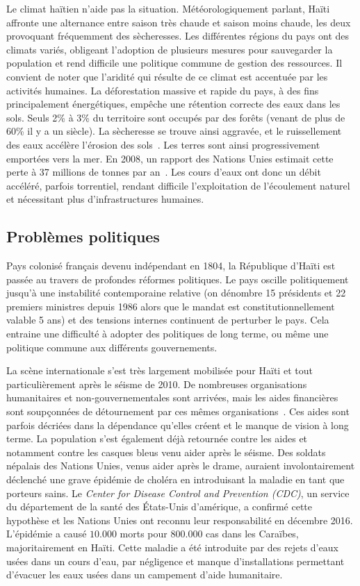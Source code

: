 \documentclass{EPL-master-thesis-covers-FR}
\begin{document}
				Le climat haïtien n'aide pas la situation. Météorologiquement parlant, Haïti affronte une alternance entre saison très chaude et saison moins chaude, les deux provoquant fréquemment des sècheresses. Les différentes régions du pays ont des climats variés, obligeant l'adoption de plusieurs mesures pour sauvegarder la population et rend difficile une politique commune de gestion des ressources. Il convient de noter que l'aridité qui résulte de ce climat est accentuée par les activités humaines. La déforestation massive et rapide du pays, à des fins principalement énergétiques, empêche une rétention correcte des eaux dans les sols. Seuls 2\% à 3\% du territoire sont occupés par des forêts (venant de plus de 60\% il y a un siècle). La sècheresse se trouve ainsi aggravée, et le ruissellement des eaux accélère l'érosion des sols~\cite{ref:desertification_of_haiti}. Les terres sont ainsi progressivement emportées vers la mer. En 2008, un rapport des Nations Unies estimait cette perte à 37 millions de tonnes par an~\cite{ref:impact_degradation_terre}. Les cours d'eaux ont donc un débit accéléré, parfois torrentiel, rendant difficile l'exploitation de l'écoulement naturel et nécessitant plus d'infrastructures humaines.

			\subsection*{Problèmes politiques}

				Pays colonisé français devenu indépendant en 1804, la République d'Haïti est passée au travers de profondes réformes politiques. Le pays oscille politiquement jusqu'à une instabilité contemporaine relative (on dénombre 15 présidents et 22 premiers ministres depuis 1986 alors que le mandat est constitutionnellement valable 5 ans) et des tensions internes continuent de perturber le pays. Cela entraine une difficulté à adopter des politiques de long terme, ou même une politique commune aux différents gouvernements.

				La scène internationale s'est très largement mobilisée pour Haïti et tout particulièrement après le séisme de 2010. De nombreuses organisations humanitaires et non-gouvernementales sont arrivées, mais les aides financières sont soupçonnées de détournement par ces mêmes organisations~\cite{ref:analyse_contextuelle_commune}. Ces aides sont parfois décriées dans la dépendance qu'elles créent et le manque de vision à long terme. La population s'est également déjà retournée contre les aides et notamment contre les casques bleus venu aider après le séisme. Des soldats népalais des Nations Unies, venus aider après le drame, auraient involontairement déclenché une grave épidémie de choléra en introduisant la maladie en tant que porteurs sains. Le \emph{Center for Disease Control and Prevention (CDC)}, un service du département de la santé des \'Etats-Unis d'amérique, a confirmé cette hypothèse et les Nations Unies ont reconnu leur responsabilité en décembre 2016. L'épidémie a causé $10.000$ morts pour $800.000$ cas dans les Caraïbes, majoritairement en Haïti. Cette maladie a été introduite par des rejets d'eaux usées dans un cours d'eau, par négligence et manque d'installations permettant d'évacuer les eaux usées dans un campement d'aide humanitaire.
\end{document}
